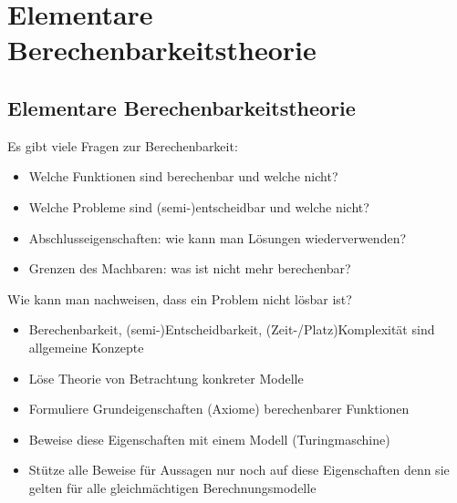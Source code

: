 \documentclass{report}
\begin{document}

	\chapter{Elementare Berechenbarkeitstheorie}
	\section{Elementare Berechenbarkeitstheorie}
	Es gibt viele Fragen zur Berechenbarkeit:
		\begin{itemize}
			\item Welche Funktionen sind berechenbar und welche nicht?
			\item Welche Probleme sind (semi-)entscheidbar und welche nicht?
			\item Abschlusseigenschaften: wie kann man Lösungen wiederverwenden?
			\item Grenzen des Machbaren: was ist nicht mehr berechenbar?
		\end{itemize}
	Wie kann man nachweisen, dass ein Problem nicht lösbar ist?
		\begin{itemize}
			\item Berechenbarkeit, (semi-)Entscheidbarkeit, (Zeit-/Platz)Komplexität sind allgemeine Konzepte
			\item Löse Theorie von Betrachtung konkreter Modelle
			\item Formuliere Grundeigenschaften (Axiome) berechenbarer Funktionen
			\item Beweise diese Eigenschaften mit einem Modell (Turingmaschine)
			\item Stütze alle Beweise für Aussagen nur noch auf diese Eigenschaften denn sie gelten für alle gleichmächtigen Berechnungsmodelle
		\end{itemize}
	
\end{document}
